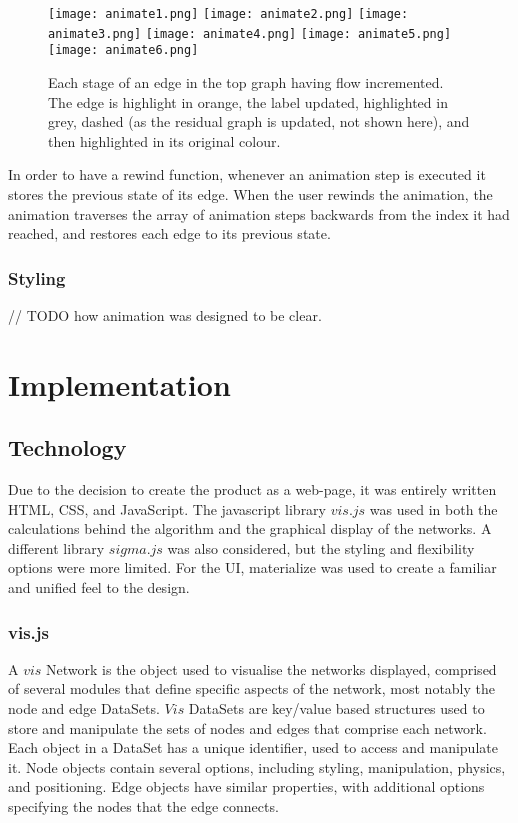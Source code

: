 \documentclass{l4proj}
\begin{document}
\begin{figure}[h]
    \centering
    \texttt{[image: animate1.png]}
    \texttt{[image: animate2.png]}
    \texttt{[image: animate3.png]}
    \texttt{[image: animate4.png]}
    \texttt{[image: animate5.png]}
    \texttt{[image: animate6.png]}
    \caption{Each stage of an edge in the top graph having flow incremented. The edge is highlight in orange, the label updated, highlighted in grey, dashed (as the residual graph is updated, not shown here), and then highlighted in its original colour.}
    \label{fig:my_label}
\end{figure}

In order to have a rewind function, whenever an animation step is executed it stores the previous state of its edge. When the user rewinds the animation, the animation traverses the array of animation steps backwards from the index it had reached, and restores each edge to its previous state.

\subsection{Styling}
// TODO how animation was designed to be clear.

\chapter{Implementation}
\section{Technology}
Due to the decision to create the product as a web-page, it was entirely written HTML, CSS, and JavaScript.
The javascript library $vis.js$ was used in both the calculations behind the algorithm and the graphical display of the networks. A different library $sigma.js$ was also considered, but the styling and flexibility options were more limited.
For the UI, materialize \cite{materialize} was used to create a familiar and unified feel to the design.

\subsection{vis.js}
A $vis$ Network \cite{network} is the object used to visualise the networks displayed, comprised of several modules that define specific aspects of the network, most notably the node and edge DataSets.
$Vis$ DataSets \cite{dataset} are key/value based structures used to store and manipulate the sets of nodes and edges that comprise each network. Each object in a DataSet has a unique identifier, used to access and manipulate it.
Node objects \cite{nodes} contain several options, including styling, manipulation, physics, and positioning. Edge objects \cite{edges} have similar properties, with additional options specifying the nodes that the edge connects.
\end{document}
